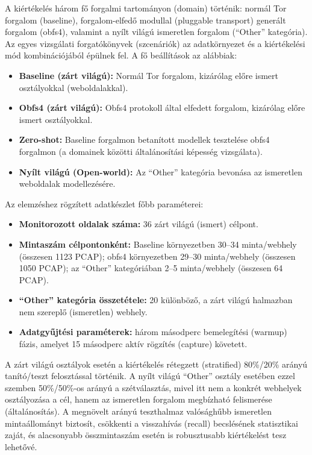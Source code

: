 \documentclass[a4paper,oneside]{article}
\begin{document}
A kiértékelés három fő forgalmi tartományon (domain) történik: normál Tor forgalom (baseline), forgalom-elfedő modullal (pluggable transport) generált forgalom (obfs4), valamint a nyílt világú ismeretlen forgalom (``Other'' kategória).
Az egyes vizsgálati forgatókönyvek (szcenáriók) az adatkörnyezet és a kiértékelési mód kombinációjából épülnek fel.
A fő beállítások az alábbiak:
\begin{itemize}
    \item \textbf{Baseline (zárt világú):} Normál Tor forgalom, kizárólag előre ismert osztályokkal (weboldalakkal).
\item \textbf{Obfs4 (zárt világú):} Obfs4 protokoll által elfedett forgalom, kizárólag előre ismert osztályokkal.
\item \textbf{Zero-shot:} Baseline forgalmon betanított modellek tesztelése obfs4 forgalmon (a domainek közötti általánosítási képesség vizsgálata).
\item \textbf{Nyílt világú (Open-world):} Az ``Other'' kategória bevonása az ismeretlen weboldalak modellezésére.
\end{itemize}

Az elemzéshez rögzített adatkészlet főbb paraméterei:
\begin{itemize}
    \item \textbf{Monitorozott oldalak száma:} 36 zárt világú (ismert) célpont.
\item \textbf{Mintaszám célpontonként:} Baseline környezetben 30--34 minta/webhely (összesen 1123 PCAP); obfs4 környezetben 29--30 minta/webhely (összesen 1050 PCAP);
az ``Other'' kategóriában 2--5 minta/webhely (összesen 64 PCAP).
    \item \textbf{``Other'' kategória összetétele:} 20 különböző, a zárt világú halmazban nem szereplő (ismeretlen) webhely.
\item \textbf{Adatgyűjtési paraméterek:} három másodperc bemelegítési (warmup) fázis, amelyet 15 másodperc aktív rögzítés (capture) követett.
\end{itemize}

A zárt világú osztályok esetén a kiértékelés rétegzett (stratified) 80\%/20\% arányú tanító/teszt felosztással történik.
A nyílt világú ``Other'' osztály esetében ezzel szemben 50\%/50\%-os arányú a szétválasztás, mivel itt nem a konkrét webhelyek osztályozása a cél, hanem az ismeretlen forgalom megbízható felismerése (általánosítás).
A megnövelt arányú teszthalmaz valósághűbb ismeretlen mintaállományt biztosít, csökkenti a visszahívás (recall) becslésének statisztikai zaját, és alacsonyabb összmintaszám esetén is robusztusabb kiértékelést tesz lehetővé.
\end{document}
